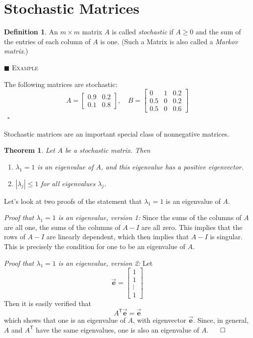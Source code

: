 \documentclass[reqno]{immbook}
\newcommand{\BE}{\vec{\textbf{e}}}
\numberwithin{equation}{chapter}
\newtheorem{theorem}{Theorem}
\numberwithin{question}{section}
\numberwithin{theorem}{chapter}
\numberwithin{figure}{chapter}
\theoremstyle{definition}
\newtheorem{definition}{Definition}[section]
\newenvironment{xexample}%
{%

\medskip\noindent\addtocounter{example}{1}$\blacksquare$ \textsc{Example \theexample}\hspace*{1em}%
}%
{%
~\hfill$\square$

\medskip
}
\begin{document}
\section{Stochastic Matrices}
\begin{definition}
An $m\times m$ matrix $A$ is called \emph{stochastic}
if $A \ge 0$ and the sum of the entries
of each column of $A$ is one.
(Such a Matrix is also called a \emph{Markov matrix}.)
\end{definition}
\begin{xexample}
The following matrices are stochastic:
\begin{equation}
  A = \begin{bmatrix}
          0.9 & 0.2 \\ 0.1 & 0.8
      \end{bmatrix},
  \quad
  B = \begin{bmatrix}
          0 & 1 & 0.2 \\ 0.5 & 0 & 0.2 \\ 0.5 & 0 & 0.6
      \end{bmatrix}
\end{equation}
\end{xexample}
Stochastic matrices are an important special class of
nonnegative matrices.
\begin{theorem}
Let $A$ be a stochastic matrix. Then
\begin{enumerate}
\item $\lambda_1 = 1$ is an eigenvalue of $A$,
and this eigenvalue has a positive eigenvector.
\item $|\lambda_j| \le 1$ for all eigenvalues $\lambda_j$.
\end{enumerate}
\end{theorem}
%
Let's look at two proofs of the statement that
$\lambda_1=1$ is an eigenvalue of $A$.

\emph{Proof that $\lambda_1=1$ is an eigenvalue, version 1:}
Since the sums of the columns of $A$ are all one,
the sums of the columns of $A-I$ are all zero.
This implies that the rows of $A-I$ are linearly
dependent, which then implies that
$A-I$ is singular.  This is precisely the condition
for one to be an eigenvalue of $A$.

\emph{Proof that $\lambda_1=1$ is an eigenvalue, version 2:}
Let
\begin{equation}
   \BE = \begin{bmatrix} 1 \\ 1 \\ \vdots \\ 1\end{bmatrix}
\end{equation}
Then it is easily verified that
\begin{equation}
  A^{\textsf{T}}\BE = \BE
\end{equation}
which shows that one is an eigenvalue of $A$, with
eigenvector $\BE$.
Since, in general, $A$ and $A^{\textsf{T}}$ have the
same eigenvalues, one is also an eigenvalue of $A$.
\hfill $\qed$
\end{document}
